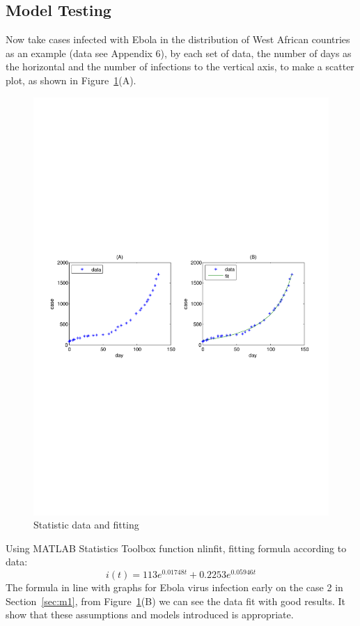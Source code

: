 \subsection{Model Testing}
Now take cases infected with Ebola in the distribution of West
African countries as an example \cite{bib5}(data see Appendix
6), by each set of data, the number of days as the horizontal
and the number of infections to the vertical axis, to make a
scatter plot, as shown in Figure~\ref{fig:5}(A).
\begin{figure}
\centering
\includegraphics[width=4.7in]{imgs/sum_anly.pdf}
\caption{Statistic data and fitting}
\label{fig:5}
\end{figure}
Using MATLAB Statistics Toolbox function nlinfit, fitting
formula according to data:
\begin{equation}
i(t)=113e^{0.01748t}+0.2253e^{0.05946t}
\label{equ:14}
\end{equation}
The formula in line with graphs for Ebola
virus infection early on the case 2 in Section~\ref{sec:m1},
from Figure~\ref{fig:5}(B) we can see the data fit with good
results. It show that these assumptions and models
introduced is appropriate.
